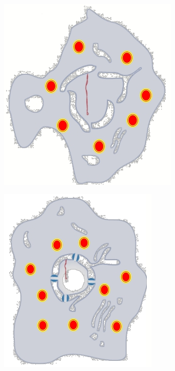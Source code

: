 \documentclass[]{article}
\begin{document}
\begin{figure}[H]
\begin{subfigure}[b]{0.45\textwidth}
	\end{subfigure}
	\begin{subfigure}[b]{0.45\textwidth}
		\caption{ }\label{fig:outside:in3}
		\includegraphics[width=\textwidth]{OutsideIn3}
	\end{subfigure}
	\begin{subfigure}[b]{0.45\textwidth}
		\caption{ }\label{fig:outside:in4}
		\includegraphics[width=\textwidth]{OutsideIn4}
	\end{subfigure}
\end{figure}
\end{document}
